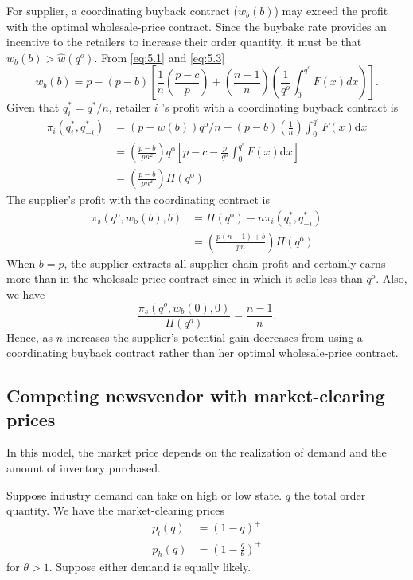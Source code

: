 For supplier, a coordinating buyback contract ($w_b(b)$) may exceed the profit with the optimal wholesale-price contract. Since the buybakc rate provides an incentive to the retailers to increase their order quantity, it must be that $w_b(b)>\hat{w}(q^o)$. From \autoref{eq:5.1} and \autoref{eq:5.3} 
\begin{equation*}
    w_b(b)=p-(p-b)\left[\frac{1}{n}\left(\frac{p-c}{p}\right)+\left(\frac{n-1}{n}\right)\left(\frac{1}{q^o}\int_0^{q^o}F(x)dx\right)\right].
\end{equation*}
Given that $q_{i}^{*}=q^{*} / n$, retailer $i$ 's profit with a coordinating buyback contract is
$$
\begin{aligned}
\pi_{i}\left(q_{i}^{*}, q_{-i}^{*}\right) &=(p-w(b)) q^{\mathrm{o}} / n-(p-b)\left(\frac{1}{n}\right) \int_{0}^{q^{\circ}} F(x) \mathrm{d} x \\
&=\left(\frac{p-b}{p n^{2}}\right) q^{\mathrm{o}}\left[p-c-\frac{p}{q^{\mathrm{o}}} \int_{0}^{q^{\circ}} F(x) \mathrm{d} x\right] \\
&=\left(\frac{p-b}{p n^{2}}\right) \Pi\left(q^{\mathrm{o}}\right)
\end{aligned}
$$
The supplier's profit with the coordinating contract is
$$
\begin{aligned}
\pi_{\mathrm{s}}\left(q^{\mathrm{o}}, w_{\mathrm{b}}(b), b\right) &=\Pi\left(q^{\mathrm{o}}\right)-n \pi_{i}\left(q_{i}^{*}, q_{-i}^{*}\right) \\
&=\left(\frac{p(n-1)+b}{p n}\right) \Pi\left(q^{\mathrm{o}}\right)
\end{aligned}
$$
When $b=p$, the supplier extracts all supplier chain profit and certainly earns more than in the wholesale-price contract since in which it sells less than $q^o$. Also, we have
\begin{equation*}
    \frac{\pi_s(q^o,w_b(0),0)}{\Pi(q^o)}=\frac{n-1}{n}.
\end{equation*}
Hence, as $n$ increases the supplier's potential gain decreases from using a coordinating buyback contract rather than her optimal wholesale-price contract.

\subsection{Competing newsvendor with market-clearing prices}
In this model, the market price depends on the realization of demand and the amount of inventory purchased.

Suppose industry demand can take on high or low state. $q$ the total order quantity. We have the market-clearing prices
\begin{align*}
    p_l(q)&=(1-q)^+\\
    p_h(q)&=\left(1-\frac{q}{\theta}\right)^+
\end{align*}
for $\theta>1$. Suppose either demand is equally likely.

